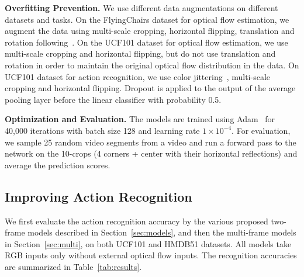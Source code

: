 \documentclass[10pt,twocolumn,letterpaper]{article}
\begin{document}
\noindent \textbf{Overfitting Prevention.} We use different data augmentations on different datasets and tasks.
On the FlyingChairs dataset for optical flow estimation, we augment the data using multi-scale cropping, horizontal flipping, translation and rotation following~\cite{FischerDIHHGSCB15}.
On the UCF101 dataset for optical flow estimation, we use multi-scale cropping and horizontal flipping, but do not use translation and rotation in order to maintain the original optical flow distribution in the data.
On UCF101 dataset for action recognition, we use color jittering~\cite{szegedyLJSRAEVR15}, multi-scale cropping and horizontal flipping.
Dropout is applied to the output of the average pooling layer before the linear classifier with probability 0.5.

\noindent \textbf{Optimization and Evaluation.} The models are trained using Adam~\cite{kingmaB15} for 40,000 iterations with batch size 128 and learning rate $1\times10^{-4}$.
For evaluation, we sample 25 random video segments from a video and run a forward pass to the network on the 10-crops (4 corners + center with their horizontal reflections) and average the prediction scores.



\subsection{Improving Action Recognition}
We first evaluate the action recognition accuracy by the various proposed two-frame models described in Section~\ref{sec:models}, and then the multi-frame models in Section~\ref{sec:multi}, on both UCF101 and HMDB51 datasets.
All models take RGB inputs only without external optical flow inputs.
The recognition accuracies are summarized in Table~\ref{tab:results}.
\end{document}
